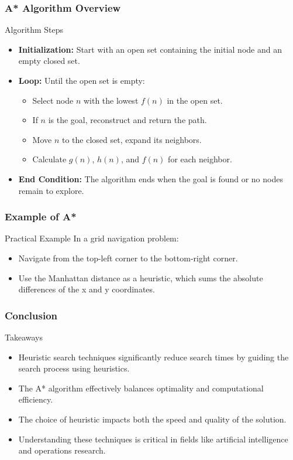 \documentclass[aspectratio=169]{beamer}
\begin{document}
\begin{frame}[fragile]
    \frametitle{A* Algorithm Overview}
    \begin{block}{Algorithm Steps}
        \begin{itemize}
            \item \textbf{Initialization:} Start with an open set containing the initial node and an empty closed set.
            \item \textbf{Loop:} Until the open set is empty:
            \begin{itemize}
                \item Select node \( n \) with the lowest \( f(n) \) in the open set.
                \item If \( n \) is the goal, reconstruct and return the path.
                \item Move \( n \) to the closed set, expand its neighbors.
                \item Calculate \( g(n) \), \( h(n) \), and \( f(n) \) for each neighbor.
            \end{itemize}
            \item \textbf{End Condition:} The algorithm ends when the goal is found or no nodes remain to explore.
        \end{itemize}
    \end{block}
\end{frame}

\begin{frame}[fragile]
    \frametitle{Example of A*}
    \begin{block}{Practical Example}
        In a grid navigation problem:
        \begin{itemize}
            \item Navigate from the top-left corner to the bottom-right corner.
            \item Use the Manhattan distance as a heuristic, which sums the absolute differences of the x and y coordinates.
        \end{itemize}
    \end{block}
\end{frame}

\begin{frame}[fragile]
    \frametitle{Conclusion}
    \begin{block}{Takeaways}
        \begin{itemize}
            \item Heuristic search techniques significantly reduce search times by guiding the search process using heuristics.
            \item The A* algorithm effectively balances optimality and computational efficiency.
            \item The choice of heuristic impacts both the speed and quality of the solution.
            \item Understanding these techniques is critical in fields like artificial intelligence and operations research.
        \end{itemize}
    \end{block}
\end{frame}
\end{document}
